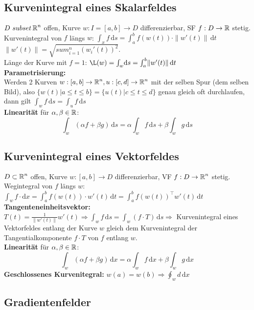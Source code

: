 \documentclass[german]{latex4ei/latex4ei_sheet}
\begin{document}
\subsection{Kurvenintegral eines Skalarfeldes}
$D \ subset \operatorname{\mathbb R}^n $ offen, Kurve $w:I=[a,b]\to D$ differenzierbar, SF $f:D\to \operatorname{\mathbb R}$ stetig.\\
Kurvenintegral von $f$ l\"angs $w$: $\int_x \! f \, \mathrm{d} s=\int_a^b\! f(w(t)) \cdot \|w'(t)\| \, \mathrm{d} t$\\
$\|w'(t)\|=\sqrt{sum_{i=1}^n(w_i'(t))^2}$.\\
L\"ange der Kurve mit $f=1$: $\L(w)=\int_w \! \mathrm{d} s=\int_a^b \! \|w'(t)\| \, \mathrm{d}t$\\
\textbf{Parametrisierung:}\\
Werden 2 Kurven $w:[a,b]\to \operatorname{\mathbb R}^n, u:[c,d]\to \operatorname{\mathbb R}^n$ mit der selben Spur (dem selben Bild), also $\{w(t)|a\le t \le b\}=\{u(t)|c\le t \le d\}$ genau gleich oft durchlaufen, dann gilt $\int_w \! f \, \mathrm{d} s=\int_u \! f \, \mathrm{d}s$\\
\textbf{Linearit\"at} f\"ur $\alpha,\beta\in\operatorname{\mathbb R}$: \[\int_w \! (\alpha f + \beta g) \, \mathrm{d} s=\alpha \int_w \! f \, \mathrm{d} s + \beta \int_w \! g \, \mathrm{d} s\] 

\subsection{Kurvenintegral eines Vektorfeldes}
$D \subset \operatorname{\mathbb R}^n$ offen, Kurve $w:[a,b]\to D$ differenzierbar, VF $f: D \to \operatorname{\mathbb R}^n$ stetig.\\
Wegintegral von $f$ l\"angs $w$: $\int_w \! f \cdot \mathrm{d} x=\int_a^b \! f(w(t)) \cdot w'(t) \, \mathrm{d} t=\int_a^b \! f(w(t))^\top w'(t)\, \mathrm{d}t$\\
\textbf{Tangenteneinheitsvektor:} $T(t)=\frac{1}{\|w'(t)\|}w'(t) \Rightarrow \int_w \! f \, \mathrm{d} s=\int_w \! (f \cdot T) \, \mathrm{d}s \Rightarrow$ Kurvenintegral eines Vektorfeldes entlang der Kurve $w$ gleich dem Kurvenintegral der Tangentialkomponente $f \cdot T$ von $f$ entlang $w$.\\
\textbf{Linearit\"at} f\"ur $\alpha,\beta \in \operatorname{\mathbb R}$: \\
\[\int_w \! (\alpha f + \beta g) \,\mathrm{d}x = \alpha \int_w \! f \, \mathrm{d}x + \beta \int_w \! g \, \mathrm{d} x\]
\textbf{Geschlossenes Kurvenitegral:} $w(a)=w(b) \Rightarrow \oint_w \! d \, \mathrm{d}x$

\subsection{Gradientenfelder}
\end{document}
